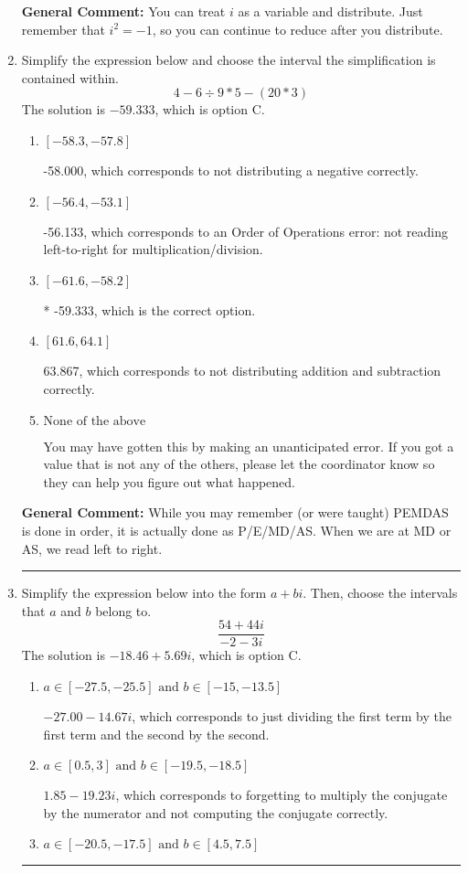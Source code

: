 \documentclass{extbook}[14pt]
\newcommand{\litem}[1]{\item #1

\rule{\textwidth}{0.4pt}}
\begin{document}
\begin{enumerate}
{\textbf{General Comment:} You can treat $i$ as a variable and distribute. Just remember that $i^2=-1$, so you can continue to reduce after you distribute.
}
\litem{
Simplify the expression below and choose the interval the simplification is contained within.
\[ 4 - 6 \div 9 * 5 - (20 * 3) \]The solution is \( -59.333 \), which is option C.\begin{enumerate}[label=\Alph*.]
\item \( [-58.3, -57.8] \)

 -58.000, which corresponds to not distributing a negative correctly.
\item \( [-56.4, -53.1] \)

 -56.133, which corresponds to an Order of Operations error: not reading left-to-right for multiplication/division.
\item \( [-61.6, -58.2] \)

* -59.333, which is the correct option.
\item \( [61.6, 64.1] \)

 63.867, which corresponds to not distributing addition and subtraction correctly.
\item \( \text{None of the above} \)

 You may have gotten this by making an unanticipated error. If you got a value that is not any of the others, please let the coordinator know so they can help you figure out what happened.
\end{enumerate}

\textbf{General Comment:} While you may remember (or were taught) PEMDAS is done in order, it is actually done as P/E/MD/AS. When we are at MD or AS, we read left to right.
}
\litem{
Simplify the expression below into the form $a+bi$. Then, choose the intervals that $a$ and $b$ belong to.
\[ \frac{54 + 44 i}{-2 - 3 i} \]The solution is \( -18.46  + 5.69 i \), which is option C.\begin{enumerate}[label=\Alph*.]
\item \( a \in [-27.5, -25.5] \text{ and } b \in [-15, -13.5] \)

 $-27.00  - 14.67 i$, which corresponds to just dividing the first term by the first term and the second by the second.
\item \( a \in [0.5, 3] \text{ and } b \in [-19.5, -18.5] \)

 $1.85  - 19.23 i$, which corresponds to forgetting to multiply the conjugate by the numerator and not computing the conjugate correctly.
\item \( a \in [-20.5, -17.5] \text{ and } b \in [4.5, 7.5] \)


\end{enumerate}}
\end{enumerate}
\end{document}
